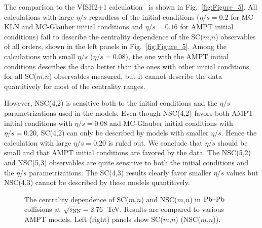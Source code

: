 The comparison to the VISH2+1 calculation~\cite{Zhu:2016puf} is shown in Fig.~\ref{fig:Figure_5}.  All calculations with large $\eta/s$ regardless of the initial conditions ($\eta/s=0.2$ for MC-KLN and MC-Glauber initial conditions and $\eta/s=0.16$ for AMPT initial conditions) fail to describe the centrality dependence of the SC($m$,$n$) observables of all orders, shown in the left panels in Fig.~\ref{fig:Figure_5}.
Among the calculations with small $\eta/s$ ($\eta/s=0.08$), the one with the AMPT initial conditions describes the data better than the ones with other initial conditions for all SC($m$,$n$) observables measured, but it cannot describe the data quantitively for most of the centrality ranges.

However, NSC(4,2) is sensitive both to the initial conditions and the $\eta/s$ parametrizations used in the models.
Even though NSC(4,2) favors both AMPT initial conditions with $\eta/s=0.08$ and MC-Glauber initial conditions with $\eta/s=0.20$,
SC(4,2) can only be described by models with smaller $\eta/s$. Hence the calculation with large $\eta/s=0.20$ is ruled out. We conclude that $\eta/s$ should be small and that AMPT initial conditions are favored by the data.
The NSC(5,2) and NSC(5,3) observables are quite sensitive to both the initial conditions and the $\eta/s$ parametrizations.
The SC(4,3) results clearly favor smaller $\eta/s$ values but NSC(4,3) cannot be described by these models quantitively.

 \begin{figure}[t!]
	\begin{center}
        \caption{The centrality dependence of SC($m$,$n$) and NSC($m$,$n$) in $\textnormal{Pb--Pb}$ collisions at $\sqrt{s_{\textnormal{NN}}}=2.76$~TeV. Results are compared to various AMPT models. Left (right) panels show SC($m$,$n$)  (NSC($m$,$n$)).}
        \label{fig:Figure_6}
        \end{center}   
 \end{figure}
 
